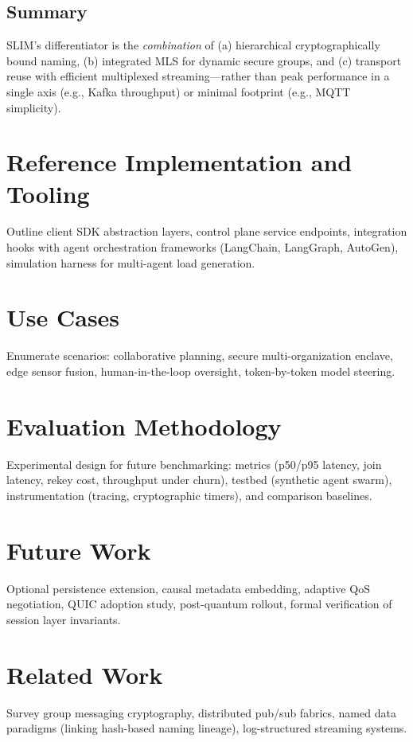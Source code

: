 \documentclass{article}
\theoremstyle{definition}
\theoremstyle{remark}
\begin{document}
\subsection{Summary}
SLIM's differentiator is the \emph{combination} of (a) hierarchical cryptographically bound naming, (b) integrated MLS for dynamic secure groups, and (c) transport reuse with efficient multiplexed streaming—rather than peak performance in a single axis (e.g., Kafka throughput) or minimal footprint (e.g., MQTT simplicity).

\section{Reference Implementation and Tooling}\label{sec:implementation}
Outline client SDK abstraction layers, control plane service endpoints, integration hooks with agent orchestration frameworks (LangChain, LangGraph, AutoGen), simulation harness for multi-agent load generation.

\section{Use Cases}\label{sec:usecases}
Enumerate scenarios: collaborative planning, secure multi-organization enclave, edge sensor fusion, human-in-the-loop oversight, token-by-token model steering.

\section{Evaluation Methodology}\label{sec:evaluation}
Experimental design for future benchmarking: metrics (p50/p95 latency, join latency, rekey cost, throughput under churn), testbed (synthetic agent swarm), instrumentation (tracing, cryptographic timers), and comparison baselines.

\section{Future Work}\label{sec:future}
Optional persistence extension, causal metadata embedding, adaptive QoS negotiation, QUIC adoption study, post-quantum rollout, formal verification of session layer invariants.

\section{Related Work}\label{sec:related}
Survey group messaging cryptography, distributed pub/sub fabrics, named data paradigms (linking hash-based naming lineage), log-structured streaming systems.
\end{document}
